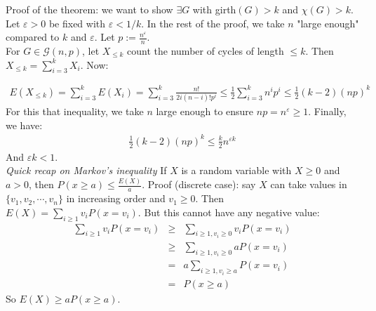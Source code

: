 Proof of the theorem: we want to show $\exists G$ with girth$(G) > k$ and $\chi(G) > k$. Let $\varepsilon > 0$ be fixed with $\varepsilon < 1/k$. In the rest of the proof, we take $n$ "large enough" compared to $k$ and $\varepsilon$. Let $p := \frac{n^\varepsilon}{n}$.\\

For $G \in \mathcal{G}(n,p)$, let $X_{\leq k}$ count the number of cycles of length $\leq k$. Then $X_{\leq k} = \sum_{i = 3}^k X_i$. Now:

\begin{eqnarray}
	E(X_{\leq k}) = \sum_{i=3}^k E(X_i) = \sum_{i=3}^k \frac{n!}{2i(n-i)! p^i} \leq \frac{1}{2} \sum_{i=3}^k n^i p^i \leq \frac{1}{2} (k-2)(np)^k
\end{eqnarray}
For this that inequality, we take $n$ large enough to ensure $np = n^\varepsilon \geq 1$. Finally, we have:
\begin{eqnarray}
	\frac{1}{2} (k-2)(np)^k \leq \frac{k}{2} n^{\varepsilon k}
\end{eqnarray}
And $\varepsilon k < 1$.\\


\textit{Quick recap on Markov's inequality}
If $X$ is a random variable with $X \geq 0$ and $a > 0$, then $P(x \geq a) \leq \frac{E(X)}{a}$. Proof (discrete case): say $X$ can take values in $\{v_1, v_2, \dotsb, v_n\}$ in increasing order and $v_1 \geq 0$. Then $E(X) = \sum_{i \geq 1} v_i P(x = v_i)$. But this cannot have any negative value: 
\begin{eqnarray}
	\sum_{i \geq 1} v_i P(x = v_i) &\geq& \sum_{i \geq 1, v_i \geq 0} v_i P(x = v_i) \\
	&\geq&\sum_{i \geq 1, v_i \geq 0}  aP(x = v_i) \\
	&=& a \sum_{i \geq 1, v_i \geq a} P(x = v_i)\\
	&=& P(x \geq a) 
\end{eqnarray} 	
So $E(X) \geq a P(x \geq a)$.
		
